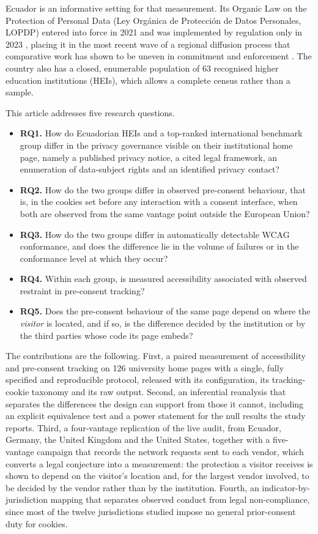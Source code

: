 \documentclass[]{interact}
\begin{document}
Ecuador is an informative setting for that measurement. Its Organic Law on the Protection of Personal Data (Ley Org\'anica de Protecci\'on de Datos Personales, LOPDP) entered into force in 2021 and was implemented by regulation only in 2023 \citep{lopdp2021,reglamentolopdp2023}, placing it in the most recent wave of a regional diffusion process that comparative work has shown to be uneven in commitment and enforcement \citep{carrillo2022follow,chavarriamora2025lack}. The country also has a closed, enumerable population of 63 recognised higher education institutions (HEIs), which allows a complete census rather than a sample.

This article addresses five research questions.

\begin{itemize}
	\item \textbf{RQ1.} How do Ecuadorian HEIs and a top-ranked international benchmark group differ in the privacy governance visible on their institutional home page, namely a published privacy notice, a cited legal framework, an enumeration of data-subject rights and an identified privacy contact?
	\item \textbf{RQ2.} How do the two groups differ in observed pre-consent behaviour, that is, in the cookies set before any interaction with a consent interface, when both are observed from the same vantage point outside the European Union?
	\item \textbf{RQ3.} How do the two groups differ in automatically detectable WCAG conformance, and does the difference lie in the volume of failures or in the conformance level at which they occur?
	\item \textbf{RQ4.} Within each group, is measured accessibility associated with observed restraint in pre-consent tracking?
	\item \textbf{RQ5.} Does the pre-consent behaviour of the same page depend on where the \emph{visitor} is located, and if so, is the difference decided by the institution or by the third parties whose code its page embeds?
\end{itemize}

The contributions are the following. First, a paired measurement of accessibility and pre-consent tracking on 126 university home pages with a single, fully specified and reproducible protocol, released with its configuration, its tracking-cookie taxonomy and its raw output. Second, an inferential reanalysis that separates the differences the design can support from those it cannot, including an explicit equivalence test and a power statement for the null results the study reports. Third, a four-vantage replication of the live audit, from Ecuador, Germany, the United Kingdom and the United States, together with a five-vantage campaign that records the network requests sent to each vendor, which converts a legal conjecture into a measurement: the protection a visitor receives is shown to depend on the visitor's location and, for the largest vendor involved, to be decided by the vendor rather than by the institution. Fourth, an indicator-by-jurisdiction mapping that separates observed conduct from legal non-compliance, since most of the twelve jurisdictions studied impose no general prior-consent duty for cookies.
\end{document}

